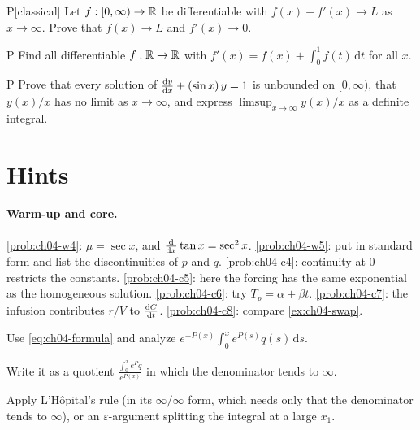 \begin{problem}{P}[classical]\label{prob:ch04-p1}
Let $f:[0,\infty)\to\mathbb{R}$ be differentiable with $f(x) + f'(x)\to L$ as
$x\to\infty$. Prove that $f(x)\to L$ and $f'(x)\to 0$.
\end{problem}

\begin{problem}{P}\label{prob:ch04-p2}
Find all differentiable $f:\mathbb{R}\to\mathbb{R}$ with
$\displaystyle f'(x) = f(x) + \int_0^1 f(t)\,\mathrm{d}t$ for all $x$.
\end{problem}

\begin{problem}{P}\label{prob:ch04-p3}
Prove that every solution of $\frac{\mathrm{d}y}{\mathrm{d}x} + (\sin x)\,y = 1$ is unbounded on
$[0,\infty)$, that $y(x)/x$ has no limit as $x\to\infty$, and express
$\limsup_{x\to\infty}y(x)/x$ as a definite integral.
\end{problem}

\section{Hints}\label{sec:ch04-hints}

\paragraph{Warm-up and core.}
\cref{prob:ch04-w4}: $\mu = \sec x$, and $\frac{\mathrm{d}}{\mathrm{d}x}\tan x = \sec^2x$.
\cref{prob:ch04-w5}: put in standard form and list the discontinuities of $p$
and $q$.
\cref{prob:ch04-c4}: continuity at $0$ restricts the constants.
\cref{prob:ch04-c5}: here the forcing has the same exponential as the
homogeneous solution.
\cref{prob:ch04-c6}: try $T_p = \alpha + \beta t$.
\cref{prob:ch04-c7}: the infusion contributes $r/V$ to $\frac{\mathrm{d}C}{\mathrm{d}t}$.
\cref{prob:ch04-c8}: compare \cref{ex:ch04-swap}.

\begin{hintlevels}
  \item Use \eqref{eq:ch04-formula} and analyze
        $e^{-P(x)}\int_0^xe^{P(s)}q(s)\,\mathrm{d}s$.
  \item Write it as a quotient $\frac{\int_0^xe^{P}q}{e^{P(x)}}$ in which the
        denominator tends to $\infty$.
  \item Apply L'H\^opital's rule (in its $\infty/\infty$ form, which needs only
        that the denominator tends to $\infty$), or an $\varepsilon$-argument
        splitting the integral at a large $x_1$.
\end{hintlevels}

